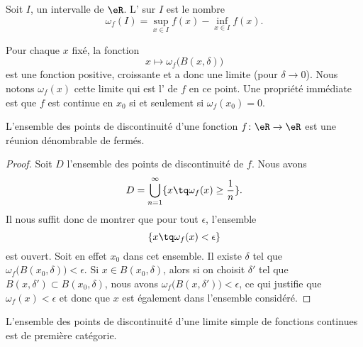 \begin{definition}
    Soit \( I\), un intervalle de \( \eR\). L' sur \( I\) est le nombre
    \begin{equation}
        \omega_f(I)=\sup_{x\in I}f(x)-\inf_{x\in I}f(x).
    \end{equation}
\end{definition}
    Pour chaque \( x\) fixé, la fonction
    \begin{equation}
        x\mapsto \omega_f\big( B(x,\delta) \big)
    \end{equation}
    est une fonction positive, croissante et a donc une limite (pour \( \delta\to 0\)). Nous notons \( \omega_f(x)\) cette limite qui est l' de \( f\) en ce point. Une propriété immédiate est que \( f\) est continue en \( x_0\) si et seulement si \( \omega_f(x_0)=0\).

    \begin{lemma}       \label{LemuaPbtQ}
    L'ensemble des points de discontinuité d'une fonction \( f\colon \eR\to \eR\) est une réunion dénombrable de fermés.
\end{lemma}

\begin{proof}
    Soit \( D\) l'ensemble des points de discontinuité de \( f\). Nous avons
    \begin{equation}
        D=\bigcup_{n=1}^{\infty}\{ x\tq \omega_f(x)\geq \frac{1}{ n } \}.
    \end{equation}
    Il nous suffit donc de montrer que pour tout \( \epsilon\), l'ensemble
    \begin{equation}
        \{ x\tq \omega_f(x)<\epsilon \}
    \end{equation}
    est ouvert. Soit en effet \( x_0\) dans cet ensemble. Il existe \( \delta\) tel que \( \omega_f\big( B(x_0,\delta) \big)<\epsilon\). Si \( x\in B(x_0,\delta)\), alors si on choisit \( \delta'\) tel que \( B(x,\delta')\subset B(x_0,\delta)\), nous avons \( \omega_f\big( B(x,\delta') \big)<\epsilon\), ce qui justifie que \( \omega_f(x)<\epsilon\) et donc que \( x\) est également dans l'ensemble considéré.
\end{proof}

\begin{theorem}
    L'ensemble des points de discontinuité d'une limite simple de fonctions continues est de première catégorie.
\end{theorem}

